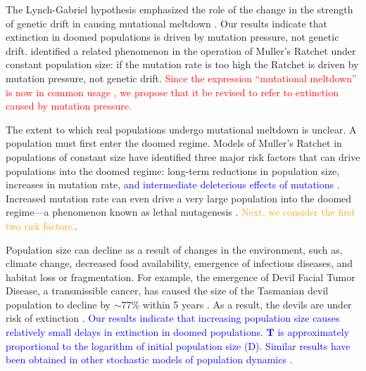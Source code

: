 \documentclass[9pt,lineno]{elife}
\newcommand{\blue}{\textcolor{blue}}
\newcommand{\red}{\textcolor{red}}
\newcommand{\org}{\textcolor{orange}}
\begin{document}
The Lynch-Gabriel hypothesis emphasized the role of the change in the strength of genetic drift in causing mutational meltdown \citep[e.g., ``we refer to this synergism between mutation accumulation and random genetic drift as a mutational meltdown'';][]{lyn93}.  
Our results indicate that extinction in doomed populations is driven by mutation pressure, not genetic drift.  
%
\citet{Gessler_The_1995}  identified a related phenomenon in the operation of Muller's Ratchet under constant population size: if the mutation rate is too high the Ratchet is driven by mutation pressure, not genetic drift.
%
\red{Since the expression ``mutational meltdown'' is now in common usage \citep[e.g.,][]{row03, Allen_Mutational_2009, McFarland_Tug_2014}, we propose that it be revised to refer to extinction caused by mutation pressure.}

The extent to which real populations undergo mutational meltdown is unclear.  A population must first enter the doomed regime.  Models of Muller's Ratchet in populations of constant size
have identified three major risk factors that can drive populations into the doomed regime: long-term reductions in population size,  increases in mutation rate, 
\blue{and intermediate deleterious effects of mutations}
\citep{Lynch_MUTATION_1990, lyn93, Gabriel_MULLER_1993, lyn95, McFarland_Impact_2013}.  Increased mutation rate can even drive a very large population into the doomed regime---a phenomenon known as lethal mutagenesis \citep{Bull_Theory_2007}.
\org{Next, we consider the first two risk factors.}.

Population size can decline as a result of changes in the environment, such as, climate change, decreased food availability, emergence of infectious diseases, and habitat loss or fragmentation.  
For example, the emergence of Devil Facial Tumor Disease, a transmissible cancer, has caused the size of the Tasmanian devil population to decline by $\sim$77\% within 5 years \citep{haw06, laz18}.  As a result, the devils are under risk of extinction \citep{mcc09}. 
%
\blue{Our results indicate that increasing population size causes relatively small delays in extinction in doomed populations.  
%
$\mathbf{T}$ is approximately proportional to the logarithm of initial population size (D).  
%
Similar results have been obtained in other stochastic models of population dynamics \citep{lan93, Jagers_On_2007}.}
\end{document}
